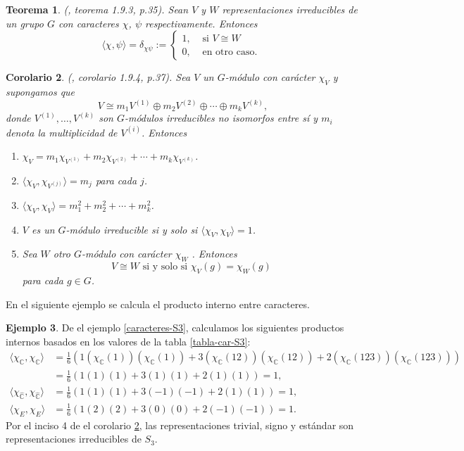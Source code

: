 \documentclass[12pt]{book}
\newtheorem{theorem}{Teorema}[section]
\newtheorem{corollary}[theorem]{Corolario}
\theoremstyle{definition}
\newtheorem{example}[theorem]{Ejemplo}
\newcounter{in}
\begin{document}
\begin{theorem}{\normalfont (\cite{sagan2001symmetric}, teorema 1.9.3, p.35)}.
  \label{prod-car-irr}
  Sean $V$ y $W$ representaciones irreducibles de un grupo $G$ con
  caracteres $\chi$, $\psi$ respectivamente. Entonces
  \[
  \langle\chi,\psi\rangle=\delta_{\chi\psi}:=
  \begin{cases}
    1, & \text{ si }  V\cong W \\
    0, & \text{ en otro caso. } 
  \end{cases}
  \]
\end{theorem}
\begin{corollary}{\normalfont (\cite{sagan2001symmetric}, corolario 1.9.4, p.37)}.
  \label{multiplicidad}
  Sea $V$ un $G$-módulo con carácter $\chi_{V}$ y supongamos que 
  \begin{equation*}
    V\cong m_{1}V^{(1)}\oplus m_{2}V^{(2)}\oplus\cdots\oplus
    m_{k}V^{(k)},
  \end{equation*}
donde $V^{(1)},\ldots,V^{(k)}$ son $G$-módulos
irreducibles no isomorfos entre sí y $m_{i}$ denota la multiplicidad
de $V^{(i)}$. Entonces
\begin{enumerate}
\item $\chi_{V}=m_{1}\chi_{V^{(1)}}+m_{2}\chi_{V^{(2)}}+\cdots+m_{k}\chi_{V^{(k)}}$.
\item $\langle\chi_{V},\chi_{V^{(j)}}\rangle=m_{j}$ para cada $j$.
\item $\langle\chi_{V},\chi_{V}\rangle=m_{1}^{2}+m_{2}^{2}+\cdots+m_{k}^{2}$.
\item $V$ es un $G$-módulo irreducible si y solo si $\langle\chi_{V},\chi_{V}\rangle=1$.
\item Sea $W$ otro $G$-módulo con carácter $\chi_{W}$ . Entonces 
  $$V\cong W \mbox{ si y solo si } \chi_{V}(g)=\chi_{W}(g)$$
  para cada $g\in G$.
\end{enumerate}
\end{corollary}

En el siguiente ejemplo se calcula el producto interno entre caracteres.
\begin{example}
  \label{rep-triv-sig-est}
  De el ejemplo \ref{caracteres-S3}, calculamos los siguientes
  productos internos basados en los valores de la tabla \ref{tabla-car-S3}:
  \begin{align*}
    \langle\chi_{\mathbb{C}},\chi_{\mathbb{C}}\rangle&=\frac{1}{6}(1(\chi_{\mathbb{C}}(1))(\chi_{\mathbb{C}}(1))+3(\chi_{\mathbb{C}}(12))(\chi_{\mathbb{C}}(12))+2(\chi_{\mathbb{C}}(123))(\chi_{\mathbb{C}}(123)))\\
    &=\frac{1}{6}(1(1)(1)+3(1)(1)+2(1)(1))=1,  \\
    \langle\chi_{\widehat{\mathbb{C}}},\chi_{\widehat{\mathbb{C}}}\rangle&=\frac{1}{6}(1(1)(1)+3(-1)(-1)+2(1)(1))=1,  \\
    \langle\chi_{E},\chi_{E}\rangle&=\frac{1}{6}(1(2)(2)+3(0)(0)+2(-1)(-1))=1.
  \end{align*}
 Por el inciso 4 de el corolario \ref{multiplicidad}, las representaciones trivial,
 signo y estándar son representaciones irreducibles de $S_{3}$.
\end{example}
\end{document}
